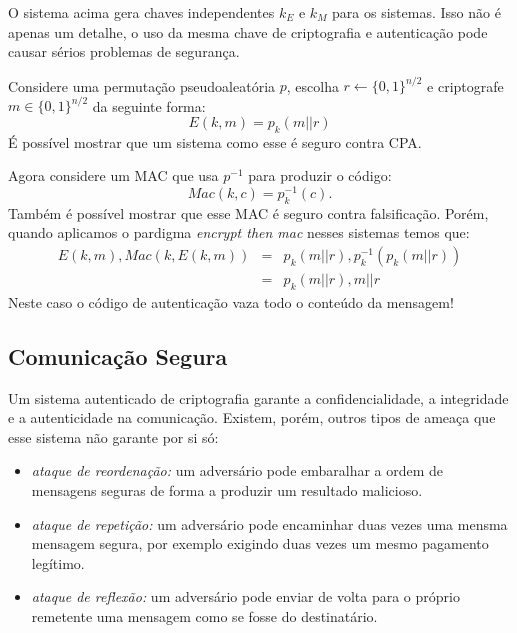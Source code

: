 O sistema acima gera chaves independentes $k_E$ e $k_M$ para os sistemas.
Isso não é apenas um detalhe, o uso da mesma chave de criptografia e autenticação pode causar sérios problemas de segurança.


\begin{example}
  Considere uma permutação pseudoaleatória $p$, escolha $r \leftarrow\{0,1\}^{n/2}$ e criptografe $m \in \{0,1\}^{n/2}$ da seguinte forma:
  \begin{displaymath}
    E(k,m) = p_k(m||r)
  \end{displaymath}
É possível mostrar que um sistema como esse é seguro contra CPA.

Agora considere um MAC que usa $p^{-1}$ para produzir o código:
\begin{displaymath}
  Mac(k,c) = p_k^{-1}(c).  
\end{displaymath}
Também é possível mostrar que esse MAC é seguro contra falsificação.
Porém, quando aplicamos o pardigma {\em encrypt then mac} nesses sistemas temos que:
\begin{eqnarray*}
  E(k,m), Mac(k, E(k,m)) & = & p_k(m||r), p_k^{-1}(p_k(m||r))\\
                         & = & p_k(m||r), m||r
\end{eqnarray*}
Neste caso o código de autenticação vaza todo o conteúdo da mensagem!
\end{example}

\subsection{Comunicação Segura}
\label{sec:comunicacao-segura}

Um sistema autenticado de criptografia garante a confidencialidade, a integridade e a autenticidade na comunicação.
Existem, porém, outros tipos de ameaça que esse sistema não garante por si só:
\begin{itemize}
\item {\em ataque de reordenação:} um adversário pode embaralhar a ordem de mensagens seguras de forma a produzir um resultado malicioso.
\item {\em ataque de repetição:} um adversário pode encaminhar duas vezes uma mensma mensagem segura, por exemplo exigindo duas vezes um mesmo pagamento legítimo.
\item {\em ataque de reflexão:} um adversário pode enviar de volta para o próprio remetente uma mensagem como se fosse do destinatário.
\end{itemize}

